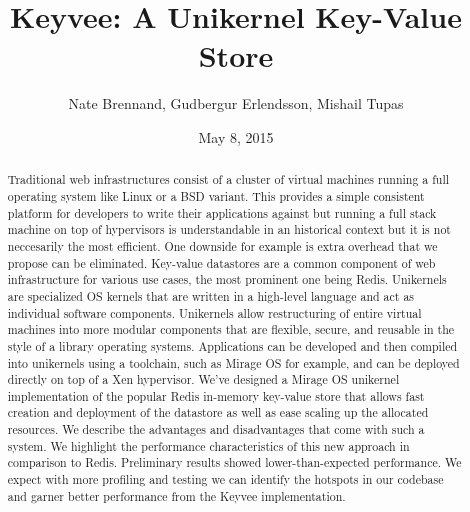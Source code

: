 \documentclass[english,10pt,twocolumn]{article}
\begin{document}
\title{Keyvee: A Unikernel Key-Value Store}
\author{Nate Brennand, Gudbergur Erlendsson, Mishail Tupas}
\date{May 8, 2015}
\maketitle
\thispagestyle{empty}


\begin{abstract}
Traditional web infrastructures consist of a cluster of virtual machines running a full operating system like Linux or a BSD variant.
This provides a simple consistent platform for developers to write their applications against but running a full stack machine on top of hypervisors is understandable in an historical context but it is not neccesarily the most efficient.
One downside for example is extra overhead that we propose can be eliminated.
Key-value datastores are a common component of web infrastructure for various use cases, the most prominent one being Redis.
Unikernels are specialized OS kernels that are written in a high-level language and act as individual software components.
Unikernels allow restructuring of entire virtual machines into more modular components that are flexible, secure, and reusable in the style of a library operating systems.
Applications can be developed and then compiled into unikernels using a toolchain, such as Mirage OS for example, and can be deployed directly on top of a Xen hypervisor.
We've designed a Mirage OS\cite{mirage} unikernel implementation of the popular Redis\cite{redis} in-memory key-value store that allows fast creation and deployment of the datastore as well as ease scaling up the allocated resources.
We describe the advantages and disadvantages that come with such a system.
We highlight the performance characteristics of this new approach in comparison to Redis.
Preliminary results showed lower-than-expected performance.
We expect with more profiling and testing we can identify the hotspots in our codebase and garner better performance from the Keyvee implementation.
\end{abstract}
\end{document}
